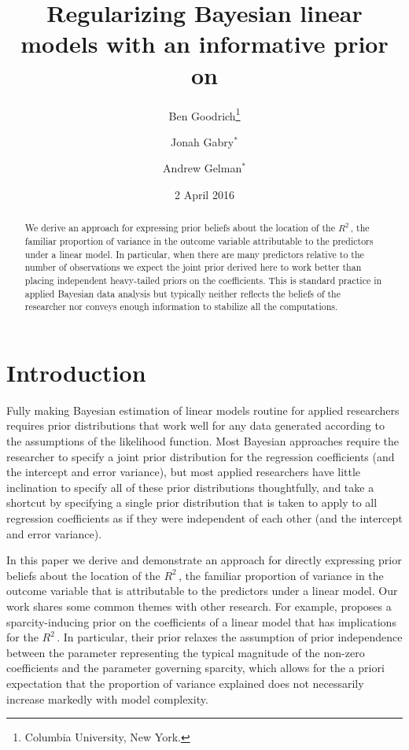 \documentclass[11pt]{article}
\title{\bf Regularizing Bayesian linear models with an informative prior on \Rsq
    \vspace{.1in}}
\author{Ben Goodrich\footnote{Columbia University, New York.}
    \and Jonah Gabry$^\ast$
    \and Andrew Gelman$^\ast$
    \vspace{.1in}}
\date{2 April 2016
    \vspace{-.2in}}
\newcommand{\Rsq}{$R^2\,$}
\begin{document}
\maketitle
\thispagestyle{empty}

\begin{abstract}
\noindent We derive an approach for expressing prior beliefs about the location
of the \Rsq, the familiar proportion of variance in the outcome variable
attributable to the predictors under a linear model. In particular, when there
are many predictors relative to the number of observations we expect the joint
prior derived here to work better than placing independent heavy-tailed priors
on the coefficients. This is standard practice in applied Bayesian data analysis
but typically neither reflects the beliefs of the researcher nor conveys enough
information to stabilize all the computations.
\end{abstract}


\section{Introduction}

Fully making Bayesian estimation of linear models routine for applied
researchers requires prior distributions that work well for any data generated
according to the assumptions of the likelihood function. Most Bayesian
approaches require the researcher to specify a joint prior distribution for the
regression coefficients (and the intercept and error variance), but most applied
researchers have little inclination to specify all of these prior distributions
thoughtfully, and take a shortcut by specifying a single prior distribution that
is taken to apply to all regression coefficients as if they were independent of
each other (and the intercept and error variance).

In this paper we derive and demonstrate an approach for directly expressing
prior beliefs about the location of the \Rsq, the familiar proportion of
variance in the outcome variable that is attributable to the predictors under a
linear model. Our work shares some common themes with other research. For
example,  proposes a sparcity-inducing prior on the
coefficients of a linear model that has implications for the \Rsq. In
particular, their prior relaxes the assumption of prior independence between the
parameter representing the typical magnitude of the non-zero coefficients and
the parameter governing sparcity, which allows for the a priori expectation that
the proportion of variance explained does not necessarily increase markedly with
model complexity.
\end{document}
